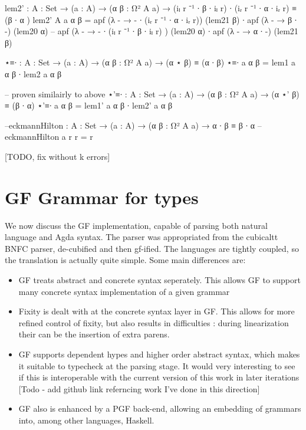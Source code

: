 \documentclass[11pt, a4paper]{article}
\begin{document}
\begin{code}
  lem2' : {A : Set} → (a : A) → (α β : Ω² {A} a) → (iₗ r ⁻¹ ∙ β ∙ iₗ r) ∙ (iᵣ r
⁻¹ ∙ α ∙ iᵣ r) ≡ (β ∙ α ) lem2' {A} a α β = apf (λ - → - ∙ (iᵣ r ⁻¹ ∙ α ∙ iᵣ r))
(lem21 β) ∙ apf (λ - → β ∙ -) (lem20 α) -- apf (λ - → - ∙ (iₗ r ⁻¹ ∙ β ∙ iₗ r) )
(lem20 α) ∙ apf (λ - → α ∙ -) (lem21 β)

  ⋆≡∙ : {A : Set} → (a : A) → (α β : Ω² {A} a) → (α ⋆ β) ≡ (α ∙ β) ⋆≡∙ a α β =
lem1 a α β ∙ lem2 a α β

  -- proven similairly to above ⋆'≡∙ : {A : Set} → (a : A) → (α β : Ω² {A} a) →
(α ⋆' β) ≡ (β ∙ α) ⋆'≡∙ a α β = lem1' a α β ∙ lem2' a α β


  --eckmannHilton : {A : Set} → (a : A) → (α β : Ω² {A} a) → α ∙ β ≡ β ∙ α
--eckmannHilton a r r = r

\end{code}

[TODO, fix without k errors]

\section{GF Grammar for types}

We now discuss the GF implementation, capable of parsing both natural language
and Agda syntax. The parser was appropriated from the cubicaltt BNFC parser,
de-cubified and then gf-ified. The languages are tightly coupled, so the
translation is actually quite simple. Some main differences are:

\begin{itemize}[noitemsep]

\item GF treats abstract and concrete syntax seperately. This allows GF to
support many concrete syntax implementation of a given grammar

\item Fixity is dealt with at the concrete syntax layer in GF. This allows for
more refined control of fixity, but also results in difficulties : during
linearization their can be the insertion of extra parens.

\item GF supports dependent hypes and higher order abstract syntax, which makes
it suitable to typecheck at the parsing stage. It would very interesting to see
if this is interoperable with the current version of this work in later
iterations [Todo - add github link referncing work I've done in this direction]

\item GF also is enhanced by a PGF back-end, allowing an embedding of grammars
into, among other languages, Haskell.

\end{itemize}
\end{document}
